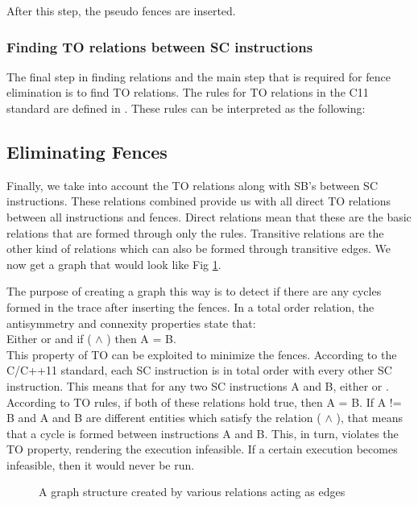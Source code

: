 \par
After this step, the pseudo fences are inserted.

\subsubsection{Finding TO relations between SC instructions}\label{to_rel}
The final step in finding relations and the main step that is required for fence elimination is to find TO relations. The rules for TO relations in the C11 standard are defined in . These rules can be interpreted as the following:


\subsection{Eliminating Fences}
Finally, we take into account the TO relations along with SB's between SC instructions. These relations combined provide us with all direct TO relations between all instructions and fences. Direct relations mean that these are the basic relations that are formed through only the rules. Transitive relations are the other kind of relations which can also be formed through transitive edges. We now get a graph that would look like Fig \ref{fig:cycles}.

\par
The purpose of creating a graph this way is to detect if there are any cycles formed in the trace after inserting the fences. In a total order relation, the antisymmetry and connexity properties state that:\\
Either  or  and if ( $\land$ ) then A = B.\\
This property of TO can be exploited to minimize the fences. According to the C/C++11 standard, each SC instruction is in total order with every other SC instruction. This means that for any two SC instructions A and B, either  or . According to TO rules, if both of these relations hold true, then A = B. If A != B and A and B are different entities which satisfy the relation ( $\land$ ), that means that a cycle is formed between instructions A and B. This, in turn, violates the TO property, rendering the execution infeasible. If a certain execution becomes infeasible, then it would never be run.

\begin{figure}
\begin{center}
	
	\caption{A graph structure created by various relations acting as edges}
	\label{fig:cycles}
\end{center}
\end{figure}

